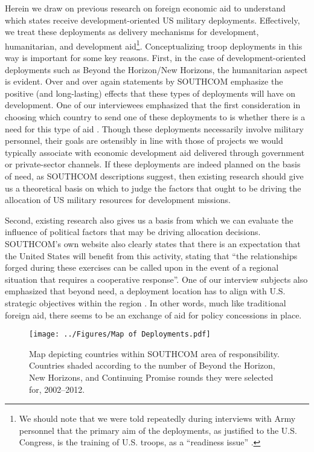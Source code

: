 \documentclass[12pt]{article}
\begin{document}
\begin{doublespace}
Herein we draw on previous research on foreign economic aid to understand which states receive development-oriented US military deployments. Effectively, we treat these deployments as delivery mechanisms for development, humanitarian, and development aid\footnote{We should note that we were told repeatedly during interviews with Army personnel that the primary aim of the deployments, as justified to the U.S. Congress, is the training of U.S. troops, as a ``readiness issue'' \cite{CPT20160309}.}. Conceptualizing troop deployments in this way is important for some key reasons. First, in the case of development-oriented deployments such as Beyond the Horizon/New Horizons, the humanitarian aspect is evident.  Over and over again statements by SOUTHCOM emphasize the positive (and long-lasting) effects that these types of deployments will have on development.  One of our interviewees emphasized that the first consideration in choosing which country to send one of these deployments to is whether there is a need for this type of aid \cite{CPT20160309}. Though these deployments necessarily involve military personnel, their goals are ostensibly in line with those of projects we would typically associate with economic development aid delivered through government or private-sector channels. If these deployments are indeed planned on the basis of need, as SOUTHCOM descriptions suggest, then existing research should give us a theoretical basis on which to judge the factors that ought to be driving the allocation of US military resources for development missions. 

Second, existing research also gives us a basis from which we can evaluate the influence of political factors that may be driving allocation decisions. SOUTHCOM's own website also clearly states that there is an expectation that the United States will benefit from this activity, stating that ``the relationships forged during these exercises can be called upon in the event of a regional situation that requires a cooperative response''\cite{southcom2015}.  One of our interview subjects also emphasized that beyond need, a deployment location has to align with U.S. strategic objectives within the region \cite{CPT20160309}.  In other words, much like traditional foreign aid, there seems to be an exchange of aid for policy concessions in place.

\begin{figure}[t]
\begin{center}
\texttt{[image: ../Figures/Map of Deployments.pdf]}
\caption{Map depicting countries within SOUTHCOM area of responsibility. Countries shaded according to the number of Beyond the Horizon, New Horizons, and Continuing Promise rounds they were selected for, 2002--2012.}
\label{fig:map1}
\end{center}
\end{figure}


\end{doublespace}
\end{document}
